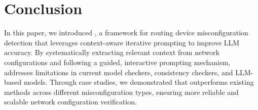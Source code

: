 \section{Conclusion}
\label{sec:conclusion}

In this paper, we introduced \sysname{}, a framework for routing device misconfiguration detection that leverages context-aware iterative prompting to improve LLM accuracy. By systematically extracting relevant context from network configurations
and following a guided, interactive prompting mechanism, \sysname{} addresses limitations in current model checkers, consistency checkers, and LLM-based models. Through case studies, we demonstrated that \sysname{} outperforms existing methods across different misconfiguration types, ensuring more reliable and scalable network configuration verification.